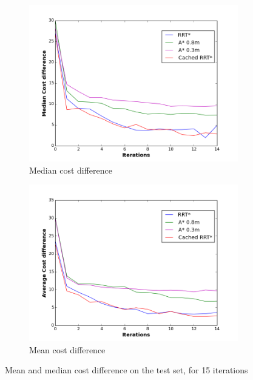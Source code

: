 \documentclass{article}  %
\begin{document}
\begin{figure}[tbh]
	\centering
      \hspace{-5mm}
      \begin{subfigure}[b]{0.455\columnwidth}

    \includegraphics[clip=true,width=1.25\textwidth]{images/cost_diff_med_test.png}
    \caption{Median cost difference}
    \label{fig:test_cd_med}
  \end{subfigure}
 \hspace{5mm}
  \begin{subfigure}[b]{0.455\columnwidth}
    \includegraphics[clip=true,width=1.25\textwidth]{images/cost_diff_test.png}
    \caption{Mean cost difference}
    \label{fig:test_cd_mean}
  \end{subfigure} 

  \caption{Mean and median cost difference on the test set, for 15 iterations}
  \label{fig:test_results}

\end{figure}
\end{document}
